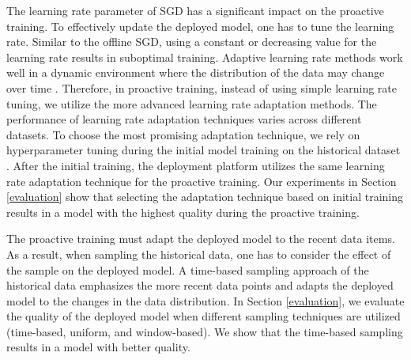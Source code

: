 The learning rate parameter of SGD has a significant impact on the proactive training.
To effectively update the deployed model, one has to tune the learning rate.
Similar to the offline SGD, using a constant or decreasing value for the learning rate results in suboptimal training.
Adaptive learning rate methods work well in a dynamic environment where the distribution of the data may change over time \cite{zeiler2012adadelta}.
Therefore, in proactive training, instead of using simple learning rate tuning, we utilize the more advanced learning rate adaptation methods.
The performance of learning rate adaptation techniques varies across different datasets.
To choose the most promising adaptation technique, we rely on hyperparameter tuning during the initial model training on the historical dataset \cite{bergstra2012random}.
After the initial training, the deployment platform utilizes the same learning rate adaptation technique for the proactive training.
Our experiments in Section \ref{evaluation} show that selecting the adaptation technique based on initial training results in a model with the highest quality during the proactive training.

The proactive training must adapt the deployed model to the recent data items.
As a result, when sampling the historical data, one has to consider the effect of the sample on the deployed model.
A time-based sampling approach of the historical data emphasizes the more recent data points and adapts the deployed model to the changes in the data distribution.
In Section \ref{evaluation}, we evaluate the quality of the deployed model when different sampling techniques are utilized (time-based, uniform, and window-based).
We show that the time-based sampling results in a model with better quality.

